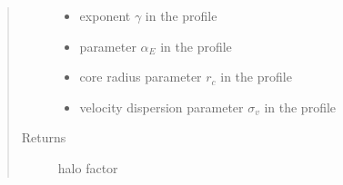 \documentclass[letterpaper,10pt,english]{sphinxmanual}
\begin{document}
\begin{fulllineitems}
\begin{quote}
\begin{description}
\begin{itemize}
\item {} 
\sphinxAtStartPar
{} \textendash{} exponent \(\gamma\) in the {\hyperref[\detokenize{diffsph.profiles:diffsph.profiles.templates.hdz}]{}} profile

\item {} 
\sphinxAtStartPar
{} \textendash{} parameter \(\alpha_E\) in the {\hyperref[\detokenize{diffsph.profiles:diffsph.profiles.templates.enst}]{}} profile

\item {} 
\sphinxAtStartPar
{} \textendash{} core radius parameter \(r_c\) in the {\hyperref[\detokenize{diffsph.profiles:diffsph.profiles.templates.cnfw}]{}} profile

\item {} 
\sphinxAtStartPar
{} \textendash{} velocity dispersion parameter \(\sigma_v\) in the {\hyperref[\detokenize{diffsph.profiles:diffsph.profiles.templates.sis}]{}} profile

\end{itemize}

\item[{Returns}] \leavevmode
\sphinxAtStartPar
halo factor

\end{description}\end{quote}

\end{fulllineitems}

\end{document}
